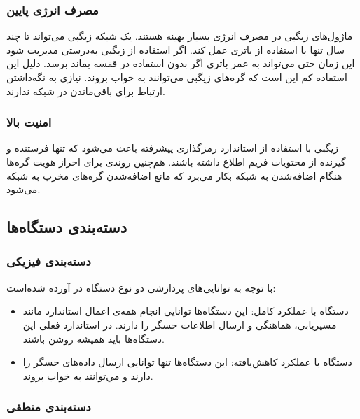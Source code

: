 \subsubsection{مصرف انرژی پایین}

ماژول‌های زیگبی در مصرف انرژی بسیار بهینه هستند. یک شبکه زیگبی می‌تواند تا چند سال تنها با استفاده از باتری عمل کند. اگر استفاده از زیگبی به‌درستی مدیریت شود این زمان حتی می‌تواند به عمر باتری اگر بدون استفاده در قفسه بماند برسد. دلیل این استفاده کم این است که گره‌های زیگبی می‌توانند به خواب بروند. نیازی به نگه‌داشتن ارتباط برای باقی‌ماندن در شبکه ندارند\cite{gislason2008zigbee}.

\subsubsection{امنیت بالا}

زیگبی با استفاده از استاندارد رمزگذاری پیشرفته باعث می‌شود که تنها فرستنده و گیرنده از محتویات فریم اطلاع داشته باشند. هم‌چنین روندی برای احراز هویت گره‌ها هنگام اضافه‌شدن به شبکه بکار می‌برد که مانع اضافه‌شدن گره‌های مخرب به شبکه می‌شود\cite{gislason2008zigbee}.

\subsection{دسته‌بندی دستگاه‌ها}

\subsubsection{دسته‌بندی فیزیکی}
با توجه به توانایی‌های پردازشی دو نوع دستگاه در  آورده شده‌است:

\begin{itemize}
\item دستگاه با عملکرد کامل: این دستگاه‌ها توانایی انجام همه‌ی اعمال استاندارد مانند مسیریابی، هماهنگی و ارسال اطلاعات حسگر را دارند. در استاندارد فعلی این دستگاه‌ها باید همیشه روشن باشند\cite{ramya2011study}.
\item دستگاه با عملکرد کاهش‌یافته: این دستگاه‌ها تنها توانایی ارسال داده‌های حسگر را دارند و مي‌توانند به خواب بروند\cite{ramya2011study}.
\end{itemize}

\subsubsection{دسته‌بندی منطقی}


